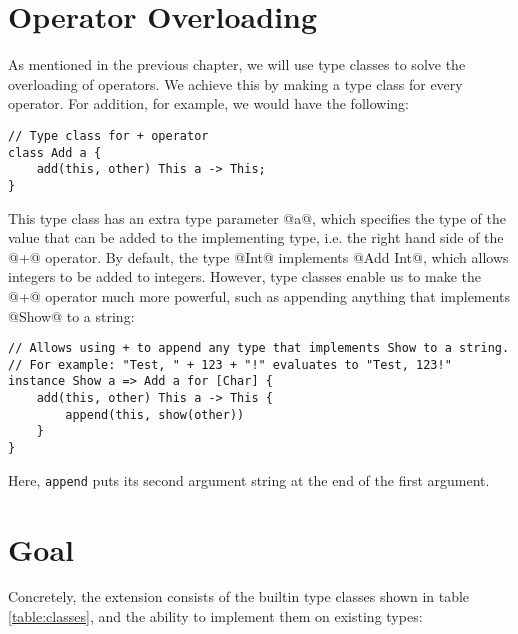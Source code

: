 \section{Operator Overloading}
As mentioned in the previous chapter, we will use type classes to solve the overloading of operators. We achieve this by making a type class for every operator. For addition, for example, we would have the following:

\begin{lstlisting}
// Type class for + operator
class Add a {
    add(this, other) This a -> This;
}
\end{lstlisting}

This type class has an extra type parameter @a@, which specifies the type of the value that can be added to the implementing type, i.e. the right hand side of the @+@ operator. By default, the type @Int@ implements @Add Int@, which allows integers to be added to integers. However, type classes enable us to make the @+@ operator much more powerful, such as appending anything that implements @Show@ to a string:

\begin{lstlisting}
// Allows using + to append any type that implements Show to a string.
// For example: "Test, " + 123 + "!" evaluates to "Test, 123!"
instance Show a => Add a for [Char] {
    add(this, other) This a -> This {
        append(this, show(other))
    }
}
\end{lstlisting}

Here, \lstinline{append} puts its second argument string at the end of the first argument.

\section{Goal}
Concretely, the extension consists of the builtin type classes shown in table \ref{table:classes}, and the ability to implement them on existing types:

